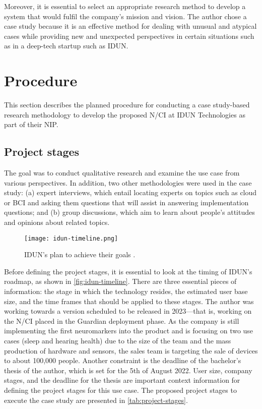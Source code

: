 Moreover, it is essential to select an appropriate research method to develop a system that would fulfil the company’s mission and vision. The author chose a case study because it is an effective method for dealing with unusual and atypical cases while providing new and unexpected perspectives in certain situations such as in a deep-tech startup such as IDUN.

\section{Procedure}
\label{chapter3-procedure}

This section describes the planned procedure for conducting a case study-based research methodology to develop the proposed N/CI at IDUN Technologies as part of their NIP.

\subsection{Project stages}
\label{chapter3-project-stages}

The goal was to conduct qualitative research and examine the use case from various perspectives. In addition, two other methodologies were used in the case study: (a) expert interviews, which entail locating experts on topics such as cloud or BCI and asking them questions that will assist in answering implementation questions; and (b) group discussions, which aim to learn about people’s attitudes and opinions about related topics.

\begin{figure}[!ht]
  \centering
  \texttt{[image: idun-timeline.png]}
  \caption[IDUN’s plan to achieve their goals.]{IDUN’s plan to achieve their goals \citep{idun_guardian_nodate}.}
  \label{fig:idun-timeline}
\end{figure}

Before defining the project stages, it is essential to look at the timing of IDUN’s roadmap, as shown in \autoref{fig:idun-timeline}. There are three essential pieces of information: the stage in which the technology resides, the estimated user base size, and the time frames that should be applied to these stages. The author was working towards a version scheduled to be released in 2023—that is, working on the N/CI placed in the Guardian deployment phase. As the company is still implementing the first neuromarkers into the product and is focusing on two use cases (sleep and hearing health) due to the size of the team and the mass production of hardware and sensors, the sales team is targeting the sale of devices to about 100,000 people. Another constraint is the deadline of the bachelor’s thesis of the author, which is set for the 5th of August 2022. User size, company stages, and the deadline for the thesis are important context information for defining the project stages for this use case. The proposed project stages to execute the case study are presented in \autoref{tab:project-stages}.

